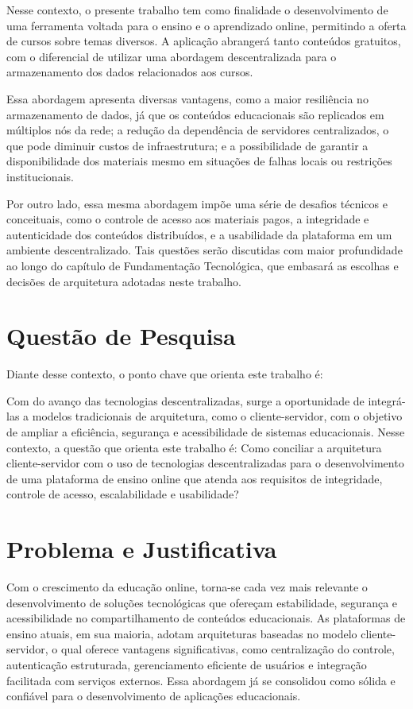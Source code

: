 Nesse contexto, o presente trabalho tem como finalidade o desenvolvimento de uma ferramenta voltada para o ensino e o aprendizado online, permitindo a oferta de cursos sobre temas diversos. A aplicação abrangerá tanto conteúdos gratuitos, com o diferencial de utilizar uma abordagem descentralizada para o armazenamento dos dados relacionados aos cursos.

Essa abordagem apresenta diversas vantagens, como a maior resiliência no armazenamento de dados, já que os conteúdos educacionais são replicados em múltiplos nós da rede; a redução da dependência de servidores centralizados, o que pode diminuir custos de infraestrutura; e a possibilidade de garantir a disponibilidade dos materiais mesmo em situações de falhas locais ou restrições institucionais.

Por outro lado, essa mesma abordagem impõe uma série de desafios técnicos e conceituais, como o controle de acesso aos materiais pagos, a integridade e autenticidade dos conteúdos distribuídos, e a usabilidade da plataforma em um ambiente descentralizado. Tais questões serão discutidas com maior profundidade ao longo do capítulo de Fundamentação Tecnológica, que embasará as escolhas e decisões de arquitetura adotadas neste trabalho.

\section{Questão de Pesquisa}
Diante desse contexto, o ponto chave que orienta este trabalho é:

Com do avanço das tecnologias descentralizadas, surge a oportunidade de integrá-las a modelos tradicionais de arquitetura, como o cliente-servidor, com o objetivo de ampliar a eficiência, segurança e acessibilidade de sistemas educacionais. Nesse contexto, a questão que orienta este trabalho é: Como conciliar a arquitetura cliente-servidor com o uso de tecnologias descentralizadas para o desenvolvimento de uma plataforma de ensino online que atenda aos requisitos de integridade, controle de acesso, escalabilidade e usabilidade?

\section{Problema e Justificativa}

Com o crescimento da educação online, torna-se cada vez mais relevante o desenvolvimento de soluções tecnológicas que ofereçam estabilidade, segurança e acessibilidade no compartilhamento de conteúdos educacionais. As plataformas de ensino atuais, em sua maioria, adotam arquiteturas baseadas no modelo cliente-servidor, o qual oferece vantagens significativas, como centralização do controle, autenticação estruturada, gerenciamento eficiente de usuários e integração facilitada com serviços externos. Essa abordagem já se consolidou como sólida e confiável para o desenvolvimento de aplicações educacionais.

